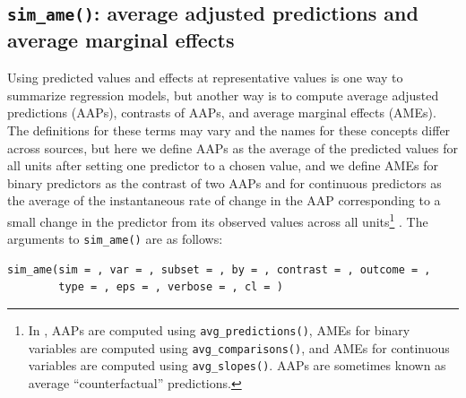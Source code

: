 \subsection{\texorpdfstring{\texttt{sim\_ame()}: average adjusted predictions and average marginal effects}{sim\_ame(): average adjusted predictions and average marginal effects}}\label{sim_ame-average-adjusted-predictions-and-average-marginal-effects}
Using predicted values and effects at representative values is one way to summarize regression models, but another way is to compute average adjusted predictions (AAPs), contrasts of AAPs, and average marginal effects (AMEs). The definitions for these terms may vary and the names for these concepts differ across sources, but here we define AAPs as the average of the predicted values for all units after setting one predictor to a chosen value, and we define AMEs for binary predictors as the contrast of two AAPs and for continuous predictors as the average of the instantaneous rate of change in the AAP corresponding to a small change in the predictor from its observed values across all units\footnote{In , AAPs are computed using \texttt{avg\_predictions()}, AMEs for binary variables are computed using \texttt{avg\_comparisons()}, and AMEs for continuous variables are computed using \texttt{avg\_slopes()}. AAPs are sometimes known as average ``counterfactual'' predictions.} \citep{longRegressionModelsCategorical2014}.
The arguments to \texttt{sim\_ame()} are as follows:
\begin{verbatim}
sim_ame(sim = , var = , subset = , by = , contrast = , outcome = ,
        type = , eps = , verbose = , cl = )
\end{verbatim}
